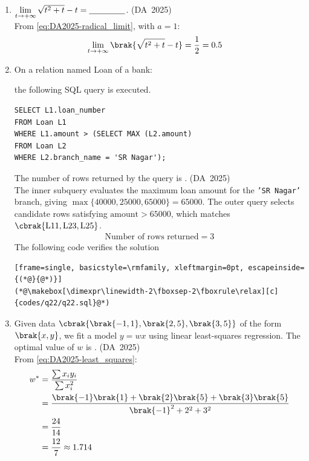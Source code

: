 \begin{enumerate}[label=\thesubsection.\arabic*, ref=\thesubsection.\theenumi]
	\item 
	$\lim\limits_{t \to +\infty} \sqrt{t^2 + t} - t = \underline{\hspace{1.5cm}}$.
	\hfill (DA~2025)
	\\
	\solution
	From \eqref{eq:DA2025-radical_limit}, with $a = 1$:
	\begin{align}
		\lim_{t \to +\infty} \brak{\sqrt{t^2 + t} - t} &= \frac{1}{2} = 0.5
	\end{align}
	
	\item 
	On a relation named Loan of a bank:
	\begin{figure}[H]
		\centering
		
		\caption{}
		\label{fig:DA-LOAN}
	\end{figure}
	the following SQL query is executed.
	\begin{lstlisting}[frame=single, basicstyle=\rmfamily]
SELECT L1.loan_number
FROM Loan L1
WHERE L1.amount > (SELECT MAX (L2.amount)
FROM Loan L2
WHERE L2.branch_name = 'SR Nagar');
	\end{lstlisting}
	The number of rows returned by the query is \underline{\hspace{1.5cm}}.
	\hfill (DA~2025)
	\\
	\solution
	The inner subquery evaluates the maximum loan amount for the \texttt{'SR Nagar'} branch, giving $\max\{40000, 25000, 65000\} = 65000$. The outer query selects candidate rows satisfying $\text{amount} > 65000$, which matches $\cbrak{\text{L11}, \text{L23}, \text{L25}}$.
	\begin{align}
		\text{Number of rows returned} = 3
	\end{align}
	The following code verifies the solution
	\begin{lstlisting}[frame=single, basicstyle=\rmfamily, xleftmargin=0pt, escapeinside={(*@}{@*)}]
(*@\makebox[\dimexpr\linewidth-2\fboxsep-2\fboxrule\relax][c]{codes/q22/q22.sql}@*)
	\end{lstlisting}
	\item 
	Given data $\cbrak{\brak{-1, 1}, \brak{2, 5}, \brak{3, 5}}$ of the form $\brak{x, y}$, we fit a model $y = wx$ using linear least-squares regression. The optimal value of $w$ is \underline{\hspace{1.5cm}}.
	\hfill (DA~2025)
	\\
	\solution
	From \eqref{eq:DA2025-least_squares}:
	\begin{align}
		w^* &= \frac{\sum x_i y_i}{\sum x_i^2}
		\\
		&= \frac{\brak{-1}\brak{1} + \brak{2}\brak{5} + \brak{3}\brak{5}}{\brak{-1}^2 + 2^2 + 3^2}
		\\
		&= \frac{24}{14}
		\\
		&= \frac{12}{7} \approx 1.714
	\end{align}
	

\end{enumerate}
